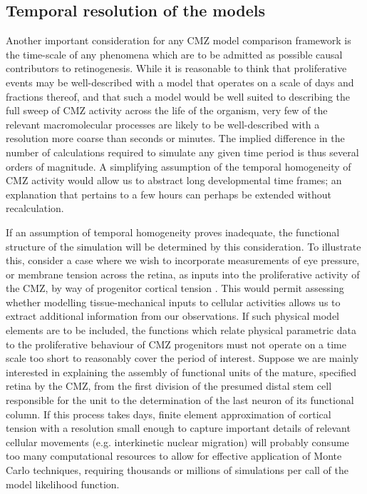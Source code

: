 \subsection{Temporal resolution of the models}
Another important consideration for any CMZ model comparison framework is the time-scale of any phenomena which are to be admitted as possible causal contributors to retinogenesis. While it is reasonable to think that proliferative events may be well-described with a model that operates on a scale of days and fractions thereof, and that such a model would be well suited to describing the full sweep of CMZ activity across the life of the organism, very few of the relevant macromolecular processes are likely to be well-described with a resolution more coarse than seconds or minutes. The implied difference in the number of calculations required to simulate any given time period is thus several orders of magnitude. A simplifying assumption of the temporal homogeneity of CMZ activity would allow us to abstract long developmental time frames; an explanation that pertains to a few hours can perhaps be extended without recalculation. 

If an assumption of temporal homogeneity proves inadequate, the functional structure of the simulation will be determined by this consideration. To illustrate this, consider a case where we wish to incorporate measurements of eye pressure, or membrane tension across the retina, as inputs into the proliferative activity of the CMZ, by way of progenitor cortical tension \cite{Winklbauer2015}. This would permit assessing whether modelling tissue-mechanical inputs to cellular activities allows us to extract additional information from our observations. If such physical model elements are to be included, the functions which relate physical parametric data to the proliferative behaviour of CMZ progenitors must not operate on a time scale too short to reasonably cover the period of interest. Suppose we are mainly interested in explaining the assembly of functional units of the mature, specified retina by the CMZ, from the first division of the presumed distal stem cell responsible for the unit to the determination of the last neuron of its functional column. If this process takes days, finite element approximation of cortical tension with a resolution small enough to capture important details of relevant cellular movements (e.g. interkinetic nuclear migration) will probably consume too many computational resources to allow for effective application of Monte Carlo techniques, requiring thousands or millions of simulations per call of the model likelihood function.

